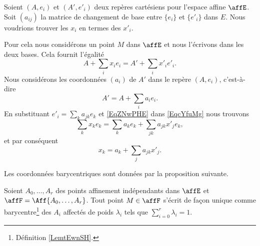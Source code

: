 Soient \( (A,e_i)\) et \( (A',e'_i)\) deux repères cartésiens pour l'espace affine \( \affE\). Soit \( (a_{ij})\) la matrice de changement de base entre \( \{ e_i \}\) et \( \{ e'_i \}\) dans \( E\). Nous voudrions trouver les \( x_i\) en termes des \( x'_i\).

Pour cela nous considérons un point \( M\) dans \( \affE\) et nous l'écrivons dans les deux bases. Cela fournit l'égalité
\begin{equation}        \label{EqcYfuMg}
    A+\sum_ix_ie_i=A'+\sum_ix'_ie'_i.
\end{equation}
Nous considérons les coordonnées \( (a_i)\) de \( A'\) dans le repère \( (A,e_i)\), c'est-à-dire
\begin{equation}    \label{EqZNwPHE}
    A'=A+\sum_ia_ie_i.
\end{equation}
En substituant \( e'_i=\sum_ka_{jk}e_k\) et \eqref{EqZNwPHE} dans \eqref{EqcYfuMg} nous trouvons
\begin{equation}
    \sum_kx_ke_k=\sum_ka_ke_k+\sum_{jk}a_{jk}x'_je_k,
\end{equation}
et par conséquent
\begin{equation}
    x_k=a_k+\sum_ja_{jk}x'_j.
\end{equation}

Les coordonnées barycentriques sont données par la proposition suivante.
\begin{proposition}      \label{PROPooTIRXooLAipRa}
    Soient \( A_0,\ldots, A_r\) des points affinement indépendants dans \( \affE\) et \( \affF=\Aff\{ A_0,\ldots, A_r \}\). Tout point \( M\in\affF\) s'écrit de façon unique comme barycentre\footnote{Définition \ref{LemtEwnSH}.} des \( A_i\) affectés de poids \( \lambda_i\) tels que \( \sum_{i=0}^r\lambda_i=1\).
\end{proposition}

